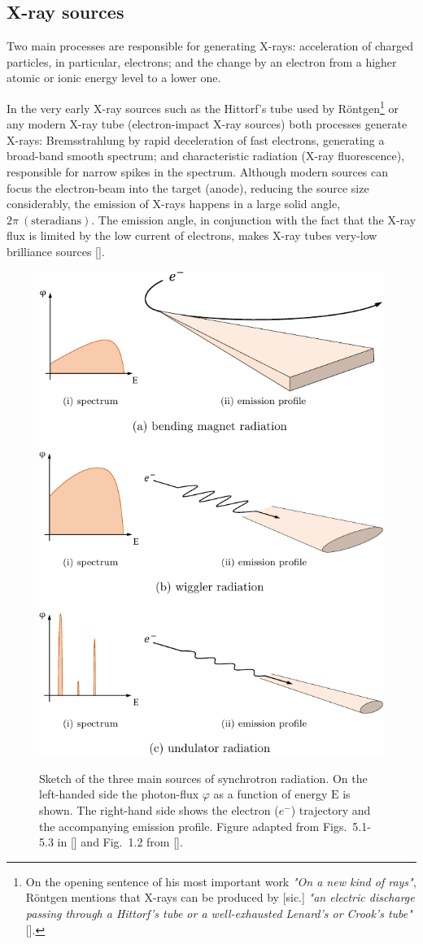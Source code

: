 \begin{refsection}
\subsection{X-ray sources}\label{sec:sources}
Two main processes are responsible for generating X-rays: acceleration of charged particles, in particular, electrons; and the change by an electron from a higher atomic or ionic energy level to a lower one.

In the very early X-ray sources such as the Hittorf's tube used by R\"{o}ntgen\footnote{On the opening sentence of his most important work \textit{"On a new kind of rays"}, R\"{o}ntgen mentions that X-rays can be produced by [sic.] \textit{"an electric discharge passing through a Hittorf's tube or a well-exhausted Lenard's or Crook's tube"} [\cite{Roentgen1896}].} or any modern X-ray tube (electron-impact X-ray sources) both processes generate X-rays: Bremsstrahlung by rapid deceleration of fast electrons, generating a broad-band smooth spectrum; and characteristic radiation (X-ray fluorescence), responsible for narrow spikes in the spectrum. Although modern sources can focus the electron-beam into the target (anode), reducing the source size considerably, the emission of X-rays happens in a large solid angle, $2\pi~(\mathrm{steradians})$. The emission angle, in conjunction with the fact that the X-ray flux is limited by the low current of electrons, makes X-ray tubes very-low brilliance sources  [\cite[\textit{§1.6} \& \textit{§2}]{Michette1993}].

\begin{figure}[t]
    \centering
    {\includegraphics[width=.55\linewidth]{figures/ch02/x-ray_sources.pdf}}
    \caption[Synchrotron radiation emission]{Sketch of the three main sources of synchrotron radiation. On the left-handed side the photon-flux $\varphi$ as a function of energy $\mathrm{E}$ is shown. The right-hand side shows the electron ($e^-$) trajectory and the accompanying emission profile. Figure adapted from Figs.~5.1-5.3 in [\cite{Attwood1999}] and Fig.~1.2 from [\cite{Clarke2004}].}
    \label{fig:emission}
\end{figure}


\end{refsection}
